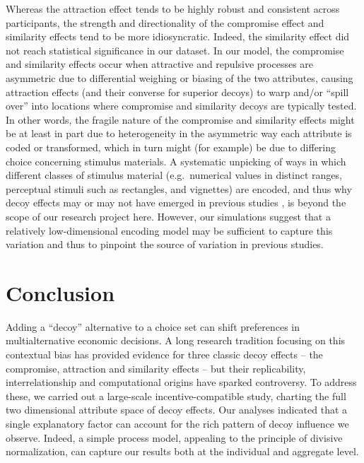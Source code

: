 \documentclass[a4paper, nobind]{templates/ociamthesis}
\begin{document}
Whereas the attraction effect tends to be highly robust and consistent across participants, the strength and directionality of the compromise effect and similarity effects tend to be more idiosyncratic. Indeed, the similarity effect did not reach statistical significance in our dataset. In our model, the compromise and similarity effects occur when attractive and repulsive processes are asymmetric due to differential weighing or biasing of the two attributes, causing attraction effects (and their converse for superior decoys) to warp and/or ``spill over'' into locations where compromise and similarity decoys are typically tested. In other words, the fragile nature of the compromise and similarity effects might be at least in part due to heterogeneity in the asymmetric way each attribute is coded or transformed, which in turn might (for example) be due to differing choice concerning stimulus materials. A systematic unpicking of ways in which different classes of stimulus material (e.g.~numerical values in distinct ranges, perceptual stimuli such as rectangles, and vignettes) are encoded, and thus why decoy effects may or may not have emerged in previous studies \autocite{frederick2014,huber2014,spektor2021}, is beyond the scope of our research project here. However, our simulations suggest that a relatively low-dimensional encoding model may be sufficient to capture this variation and thus to pinpoint the source of variation in previous studies.

\hypertarget{conclusion}{%
\section{Conclusion}\label{conclusion}}

Adding a ``decoy'' alternative to a choice set can shift preferences in multialternative economic decisions. A long research tradition focusing on this contextual bias has provided evidence for three classic decoy effects -- the compromise, attraction and similarity effects -- but their replicability, interrelationship and computational origins have sparked controversy. To address these, we carried out a large-scale incentive-compatible study, charting the full two dimensional attribute space of decoy effects. Our analyses indicated that a single explanatory factor can account for the rich pattern of decoy influence we observe. Indeed, a simple process model, appealing to the principle of divisive normalization, can capture our results both at the individual and aggregate level.
\end{document}
